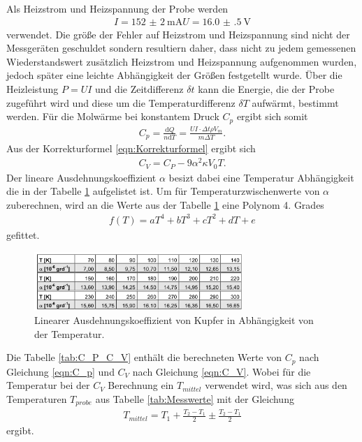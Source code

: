 Als Heizstrom und Heizspannung der Probe
werden
\begin{align}
  I = \SI{152(2)}{\milli\ampere}
  U = \SI{16.0(5)}{\volt}
\end{align}
verwendet. Die größe
der Fehler auf Heizstrom und Heizspannung
sind nicht der Messgeräten geschuldet
sondern resultiern daher, dass nicht
zu jedem gemessenen Wiederstandswert
zusätzlich Heizstrom und Heizspannung
aufgenommen wurden, jedoch später
eine leichte Abhängigkeit
der Größen festgetellt wurde.
Über die Heizleistung $P=UI$
und die Zeitdifferenz $\delta t$
kann die Energie, die der Probe zugeführt wird
und diese um die Temperaturdifferenz
$\delta T$ aufwärmt, bestimmt werden.
Für die Molwärme bei konstantem
Druck $C_p$ ergibt sich somit
\begin{align}
  C_p =\frac{\text{d} Q}{n \text{d} T }  = \frac{UI \cdot \Delta t \rho V_m }{m \Delta T}. \label{eqn:C_p}
\end{align}
Aus der Korrekturformel \eqref{eqn:Korrekturformel} ergibt sich
\begin{align}
C_V = C_P- 9\alpha^2 \kappa V_0 T \label{eqn:C_V}.
\end{align}
Der lineare Ausdehnungskoeffizient $\alpha$ besizt dabei
eine Temperatur Abhängigkeit die in der Tabelle \ref{fig:alpha}
aufgelistet ist. Um für Temperaturzwischenwerte von $\alpha$
zuberechnen, wird an die Werte aus der Tabelle \ref{fig:alpha}
eine Polynom 4. Grades
\begin{align}
f(T) = a T^4 + b  T^3 + c  T^2 + d T + e
\end{align}
gefittet.
\begin{figure}
  \centering
  \includegraphics[width=0.7\textwidth]{alpha.PNG}
  \caption{Linearer Ausdehnungskoeffizient von Kupfer in Abhängigkeit von der Temperatur.}
  \label{fig:alpha}
\end{figure}

Die Tabelle \ref{tab:C_P_C_V} enthält die berechneten Werte von $C_p$ nach Gleichung \eqref{eqn:C_p} und $C_V$ nach Gleichung \eqref{eqn:C_V}.
Wobei für die Temperatur bei der $C_V$ Berechnung ein $T_{mittel}$ verwendet wird, was sich aus den Temperaturen $T_{probe}$ aus Tabelle \ref{tab:Messwerte}
mit der Gleichung
\begin{align}
  T_{mittel} = T_1 + \frac{T_2-T_1}{2} \pm \frac{T_2-T_1}{2}
\end{align}
ergibt.

